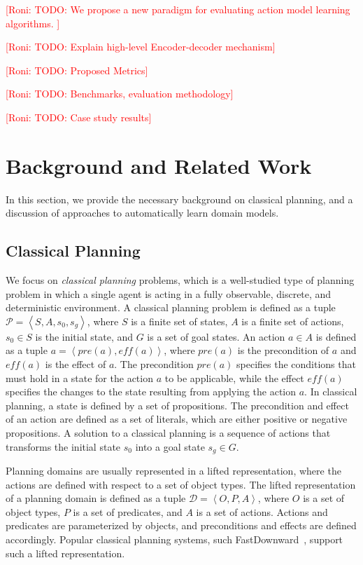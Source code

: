 \documentclass{article}
\theoremstyle{definition}
\theoremstyle{remark}
\newcommand{\tuple}[1]{\ensuremath{\left \langle #1 \right \rangle }}
\newcommand{\roni}[1]{{\textcolor{red}{[Roni: #1]}}}
\begin{document}
\roni{TODO: We propose a new paradigm for evaluating action model learning algorithms. }

\roni{TODO: Explain high-level Encoder-decoder mechanism}

\roni{TODO: Proposed Metrics}

\roni{TODO: Benchmarks, evaluation methodology}

\roni{TODO: Case study results}

\section{Background and Related Work}

In this section, we provide the necessary background on classical planning, and a discussion of approaches to automatically learn domain models. 

\subsection{Classical Planning}
We focus on \emph{classical planning} problems, which is a well-studied type of planning problem in which a single agent is acting in a fully observable, discrete, and deterministic environment. 
A classical planning problem is defined as a tuple $\mathcal{P} = \tuple{S, A, s_0, s_g}$, where $S$ is a finite set of states, $A$ is a finite set of actions, $s_0 \in S$ is the initial state, and $G$ is a set of goal states. 
An action $a\in A$ is defined as a tuple $a = \tuple{\mathit{pre}(a), \mathit{eff}(a)}$, where $\mathit{pre}(a)$ is the precondition of $a$ and $\mathit{eff}(a)$ is the effect of $a$. 
The precondition $\mathit{pre}(a)$ specifies the conditions that must hold in a state for the action $a$ to be applicable, while the effect $\mathit{eff}(a)$ specifies the changes to the state resulting from applying the action $a$.   
In classical planning, a state is defined by a set of propositions.  
The precondition and effect of an action are defined as a set of literals, which are either positive or negative propositions. 
A solution to a classical planning is a sequence of actions that transforms the initial state $s_0$ into a goal state $s_g\in G$.   


Planning domains are usually represented in a lifted representation, where the actions are defined with respect to a set of object types.
The lifted representation of a planning domain is defined as a tuple $\mathcal{D} = \tuple{O, P, A}$, where $O$ is a set of object types, $P$ is a set of predicates, and $A$ is a set of actions. Actions and predicates are parameterized by objects, and preconditions and effects are defined accordingly. 
Popular classical planning systems, such FastDownward~\citep{helmert2006fast}, support such a lifted representation. 
\end{document}
